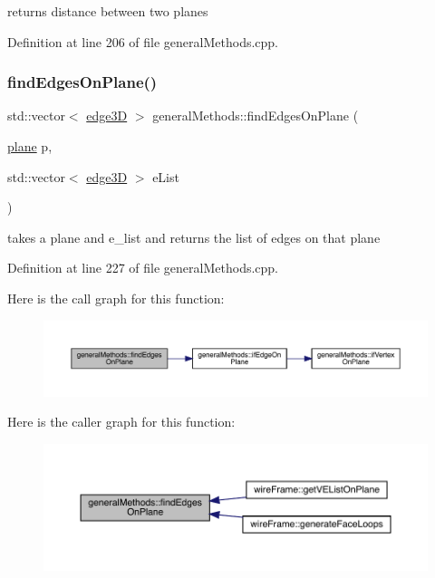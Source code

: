 returns distance between two planes 

Definition at line 206 of file general\+Methods.\+cpp.

\mbox{\label{namespacegeneral_methods_a9bff72be73e4d6faec798a23b8f28cb9}} 
\subsubsection{\texorpdfstring{find\+Edges\+On\+Plane()}{findEdgesOnPlane()}}
{\footnotesize\ttfamily std\+::vector$<$ \mbox{\hyperlink{structedge3_d}{edge3D}} $>$ general\+Methods\+::find\+Edges\+On\+Plane (\begin{DoxyParamCaption}\item[{\mbox{\hyperlink{structplane}{plane}}}]{p,  }\item[{std\+::vector$<$ \mbox{\hyperlink{structedge3_d}{edge3D}} $>$}]{e\+List }\end{DoxyParamCaption})}

takes a plane and e\+\_\+list and returns the list of edges on that plane 

Definition at line 227 of file general\+Methods.\+cpp.

Here is the call graph for this function\+:
\nopagebreak
\begin{figure}[H]
\begin{center}
\leavevmode
\includegraphics[width=350pt]{namespacegeneral_methods_a9bff72be73e4d6faec798a23b8f28cb9_cgraph}
\end{center}
\end{figure}
Here is the caller graph for this function\+:
\nopagebreak
\begin{figure}[H]
\begin{center}
\leavevmode
\includegraphics[width=350pt]{namespacegeneral_methods_a9bff72be73e4d6faec798a23b8f28cb9_icgraph}
\end{center}
\end{figure}
\mbox{\label{namespacegeneral_methods_aa0669678cf59876e3249ddce7a0d1ce3}} 
